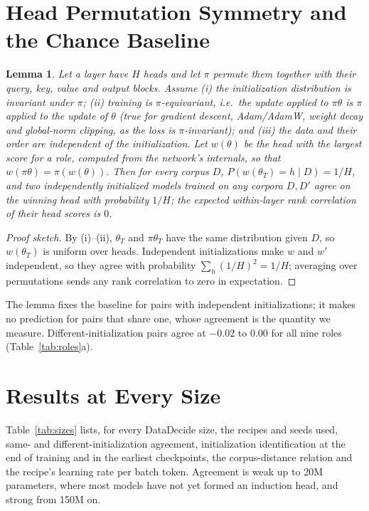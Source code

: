 \documentclass[11pt]{article}
\newtheorem{lemma}{Lemma}
\begin{document}
\section{Head Permutation Symmetry and the Chance Baseline}
\label{app:lemma}
\begin{lemma}
\label{lem:symmetry}
Let a layer have $H$ heads and let $\pi$ permute them together with their query, key, value and output blocks.
Assume (i) the initialization distribution is invariant under $\pi$; (ii) training is $\pi$-equivariant, i.e.\ the update applied to $\pi\theta$ is $\pi$ applied to the update of $\theta$ (true for gradient descent, Adam/AdamW, weight decay and global-norm clipping, as the loss is $\pi$-invariant); and (iii) the data and their order are independent of the initialization.
Let $w(\theta)$ be the head with the largest score for a role, computed from the network's internals, so that $w(\pi\theta) = \pi(w(\theta))$.
Then for every corpus $D$, $P(w(\theta_T) = h \mid D) = 1/H$, and two independently initialized models trained on any corpora $D, D'$ agree on the winning head with probability $1/H$; the expected within-layer rank correlation of their head scores is $0$.
\end{lemma}
\begin{proof}[Proof sketch]
By (i)--(ii), $\theta_T$ and $\pi\theta_T$ have the same distribution given $D$, so $w(\theta_T)$ is uniform over heads.
Independent initializations make $w$ and $w'$ independent, so they agree with probability $\sum_h (1/H)^2 = 1/H$; averaging over permutations sends any rank correlation to zero in expectation.
\end{proof}
The lemma fixes the baseline for pairs with independent initializations; it makes no prediction for pairs that share one, whose agreement is the quantity we measure.
Different-initialization pairs agree at $-0.02$ to $0.00$ for all nine roles (Table~\ref{tab:roles}a).

\section{Results at Every Size}
\label{app:sizes}

Table~\ref{tab:sizes} lists, for every DataDecide size, the recipes and seeds used, same- and different-initialization agreement, initialization identification at the end of training and in the earliest checkpoints, the corpus-distance relation and the recipe's learning rate per batch token.
Agreement is weak up to 20M parameters, where most models have not yet formed an induction head, and strong from 150M on.
\end{document}
